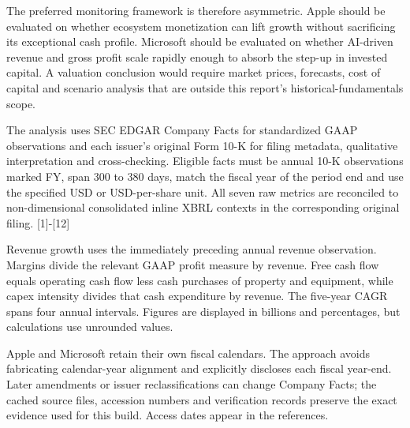 \documentclass[10pt]{article}
\begin{document}
\noindent The preferred monitoring framework is therefore asymmetric. Apple should be evaluated on whether ecosystem monetization can lift growth without sacrificing its exceptional cash profile. Microsoft should be evaluated on whether AI-driven revenue and gross profit scale rapidly enough to absorb the step-up in invested capital. A valuation conclusion would require market prices, forecasts, cost of capital and scenario analysis that are outside this report's historical-fundamentals scope.\par
\newpage
{}\noindent The analysis uses SEC EDGAR Company Facts for standardized GAAP observations and each issuer's original Form 10-K for filing metadata, qualitative interpretation and cross-checking. Eligible facts must be annual 10-K observations marked FY, span 300 to 380 days, match the fiscal year of the period end and use the specified USD or USD-per-share unit. All seven raw metrics are reconciled to non-dimensional consolidated inline XBRL contexts in the corresponding original filing. [1]-[12]\par
\noindent Revenue growth uses the immediately preceding annual revenue observation. Margins divide the relevant GAAP profit measure by revenue. Free cash flow equals operating cash flow less cash purchases of property and equipment, while capex intensity divides that cash expenditure by revenue. The five-year CAGR spans four annual intervals. Figures are displayed in billions and percentages, but calculations use unrounded values.\par
\noindent Apple and Microsoft retain their own fiscal calendars. The approach avoids fabricating calendar-year alignment and explicitly discloses each fiscal year-end. Later amendments or issuer reclassifications can change Company Facts; the cached source files, accession numbers and verification records preserve the exact evidence used for this build. Access dates appear in the references.\par
\newpage
\end{document}
